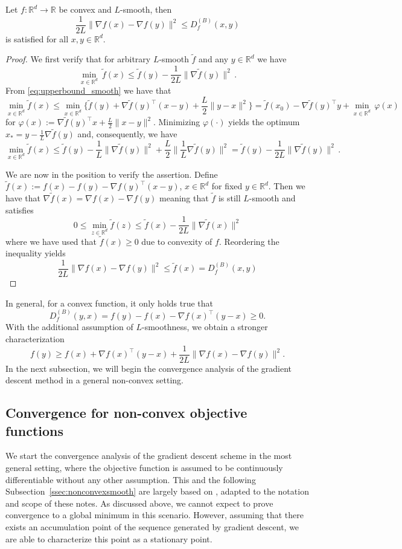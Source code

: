 \documentclass[12pt,openany]{book}
\theoremstyle{definition}
\theoremstyle{definition}
\newcommand{\R}{\mathbb{R}}
\begin{document}
\begin{lemma}\label{lem:convex_and_smooth}
Let $f:\R^d\to\R$ be convex and $L$-smooth, then
\[\frac{1}{2L}\|\nabla f(x)-\nabla f(y)\|^2\le D_f^{(B)}(x,y) \]
is satisfied for all $x,y\in\R^d$.
\end{lemma}
\begin{proof}
    We first verify that for arbitrary $L$-smooth $\tilde f$ and any $y\in\R^d$ we have
    \[ \min_{x\in\R^d}\ \tilde f(x) \le \tilde f(y) -\frac{1}{2L} \|\nabla \tilde f(y)\|^2\,.\]
    From \eqref{eq:upperbound_smooth} we have that 
    \[ \min_{x\in\R^d} \tilde f(x) \le \min_{x\in\R^d} \{\tilde f(y) + \nabla \tilde f(y)^\top (x-y) + \frac{L}2 \|y-x\|^2\} = \tilde f(x_0) - \nabla \tilde f(y)^\top y + \min_{x\in\R^d}\,\varphi(x)\]
    for $\varphi(x) := \nabla \tilde f(y)^\top x + \frac{L}{2} \|x-y\|^2$. Minimizing $\varphi(\cdot)$ yields the optimum $x_\ast = y-\frac{1}{L}\nabla \tilde f(y)$ and, consequently, we have
    \[ \min_{x\in\R^d} \tilde f(x) \le \tilde f(y) -\frac{1}{L}\|\nabla \tilde f(y)\|^2 + \frac{L}2 \|\frac{1}{L}\nabla \tilde f(y)\|^2 = \tilde f(y) - \frac{1}{2L} \|\nabla \tilde f(y)\|^2\,.\]

    We are now in the position to verify the assertion. Define $\tilde f(x) := f(x)-f(y) - \nabla f(y)^\top (x-y)$, $x\in\R^d$ for fixed $y\in\R^d$. Then we have that $\nabla \tilde f(x) = \nabla f(x) -\nabla f(y)$ meaning that $\tilde f$ is still $L$-smooth and satisfies 
    \[0 \le \min_{z\in\R^d}\tilde f(z) \le \tilde f(x) -\frac{1}{2L} \|\nabla \tilde f(x)\|^2 \] 
    where we have used that $\tilde f(x)\ge 0$ due to convexity of $f$. Reordering the inequality yields
    \[ \frac{1}{2L} \|\nabla f(x)-\nabla f(y)\|^2 \le \tilde f(x) = D_f^{(B)} (x,y) \]
    
\end{proof}
In general, for a convex function, it only holds true that
\[D_f^{(B)} (y,x) = f(y)-f(x)-\nabla f(x)^\top(y-x)\ge 0.\]
With the additional assumption of $L$-smoothness, we obtain a stronger characterization
\[f(y) \ge f(x) + \nabla f(x)^\top (y-x) + \frac{1}{2L}\|\nabla f(x)-\nabla f(y)\|^2. \]
In the next subsection, we will begin the convergence analysis of the gradient descent method in a general non-convex setting.

\subsection{Convergence for non-convex objective functions}
We start the convergence analysis of the gradient descent scheme in the most general setting, where the objective function is assumed to be continuously differentiable without any other assumption.  This and the following Subsection~\ref{ssec:nonconvexsmooth} are largely based on \cite[Section~1.2.2]{DPB15}, adapted to the notation and scope of these notes. As discussed above, we cannot expect to prove convergence to a global minimum in this scenario. However, assuming that there exists an accumulation point of the sequence generated by gradient descent, we are able to characterize this point as a stationary point. 
\end{document}
